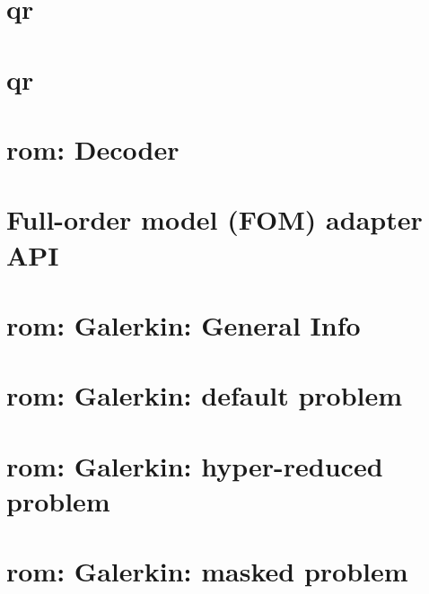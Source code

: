 \let\mypdfximage\pdfximage\def\pdfximage{\immediate\mypdfximage}\documentclass[twoside]{book}
\newcommand{\+}{\discretionary{\mbox{\scriptsize$\hookleftarrow$}}{}{}}
\begin{document}
\chapter{qr}
\label{md_pages_components_qr_copy}

\chapter{qr}
\label{md_pages_components_qr}

\chapter{rom\+: Decoder}
\label{md_pages_components_rom_decoder}

\chapter{Full-\/order model (FOM) adapter API}
\label{md_pages_components_rom_fom_apis}

\chapter{rom\+: Galerkin\+: General Info}
\label{md_pages_components_rom_galerkin}

\chapter{rom\+: Galerkin\+: default problem}
\label{md_pages_components_rom_galerkin_default}

\chapter{rom\+: Galerkin\+: hyper-\/reduced problem}
\label{md_pages_components_rom_galerkin_hypred}

\chapter{rom\+: Galerkin\+: masked problem}
\label{md_pages_components_rom_galerkin_masked}

\end{document}
